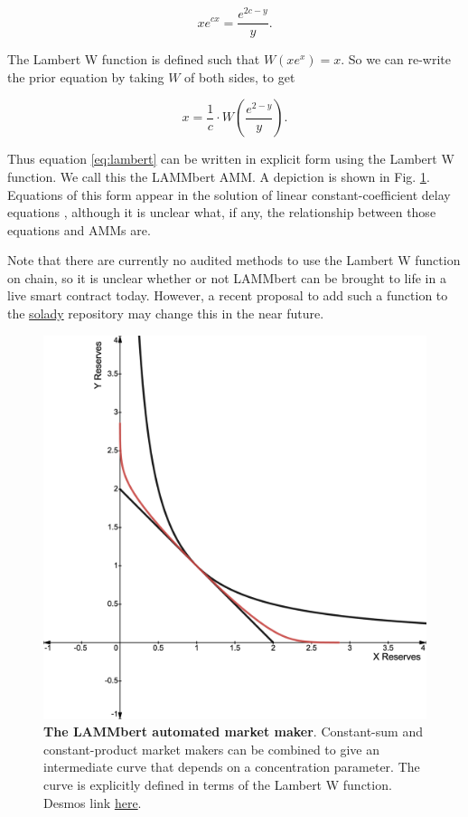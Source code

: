 \documentclass[bibliography=numbered]{article}
\begin{document}
\begin{equation}
\label{eq:lambert}
    xe^{cx}
    = 
    \frac{e^{2c-y}}{y}.
\end{equation}

The Lambert W function is defined such that $W(xe^x) = x$. So we can re-write the prior equation by taking $W$ of both sides, to get

\begin{equation}
\label{eq:lambert-2}
    x
    = 
    \frac{1}{c} \cdot W\left( \frac{e^{2-y}}{y} \right).
\end{equation}

Thus equation \eqref{eq:lambert} can be written in explicit form using the Lambert W function. We call this the LAMMbert AMM. A depiction is shown in Fig. \ref{fig:lambertw}. Equations of this form appear in the solution of linear constant-coefficient delay equations \cite{corless1996lambert}, although it is unclear what, if any, the relationship between those equations and AMMs are. 

Note that there are currently no audited methods to use the Lambert W function on chain, so it is unclear whether or not LAMMbert can be brought to life in a live smart contract today. However, a recent proposal to add such a function to the \href{https://github.com/Vectorized/solady/pull/706}{solady} repository may change this in the near future.

\begin{figure}
    \centering
    \includegraphics[width=0.5\linewidth]{lambertw.png}
    \caption{\textbf{The LAMMbert automated market maker}. Constant-sum and constant-product market makers can be combined to give an intermediate curve that depends on a concentration parameter. The curve is explicitly defined in terms of the Lambert W function. Desmos link \href{https://www.desmos.com/calculator/9jx4j0rvzm}{here}.}
    \label{fig:lambertw}
\end{figure}

\printbibliography %
\end{document}
